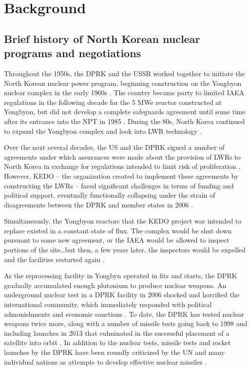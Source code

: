 \documentclass{article}
\begin{document}
\section{Background}

\subsection{Brief history of North Korean nuclear programs and negotiations}

Throughout the 1950s, the DPRK and the USSR worked together to initiate the North Korean nuclear power program, beginning construction on the Yongbyon nuclear complex in the early 1960s \cite{nti15}. The country became party to limited IAEA regulations in the following decade for the 5 MWe reactor constructed at Yongbyon, but did not develop a complete safeguards agreement until some time after its entrance into the NPT in 1985 \cite{iaea09}. During the 80s, North Korea continued to expand the Yongbyon complex and look into LWR technology \cite{ntiYongbyon}.

Over the next several decades, the US and the DPRK signed a number of agreements under which assurances were made about the provision of LWRs to North Korea in exchange for regulations intended to limit risk of proliferation \cite{agreed, davenport}. However, KEDO – the organization created to implement these agreements by constructing the LWRs – faced significant challenges in terms of funding and political support, eventually functionally collapsing under the strain of disagreements between the DPRK and member states in 2006 \cite{kedohist}.

Simultaneously, the Yongbyon reactors that the KEDO project was intended to replace existed in a constant state of flux. The complex would be shut down pursuant to some new agreement, or the IAEA would be allowed to inspect portions of the site…but then, a few years later, the inspectors would be expelled and the facilities restarted again \cite{davenport,nti15,iaea09}.

As the reprocessing facility in Yongbyn operated in fits and starts, the DPRK gradually accumulated enough plutonium to produce nuclear weapons. An underground nuclear test in a DPRK facility in 2006 shocked and horrified the international community, which immediately responded with political admonishments and economic sanctions \cite{davenport}. To date, the DPRK has tested nuclear weapons twice more, along with a number of missile tests going back to 1998 \cite{orfall} and including launches in 2013 that culminated in the successful placement of a satellite into orbit \cite{davenport}. In addition to the nuclear tests, missile tests and rocket launches by the DPRK have been roundly criticized by the UN and many individual nations as attempts to develop effective nuclear missiles \cite{unApr12}.
\end{document}
